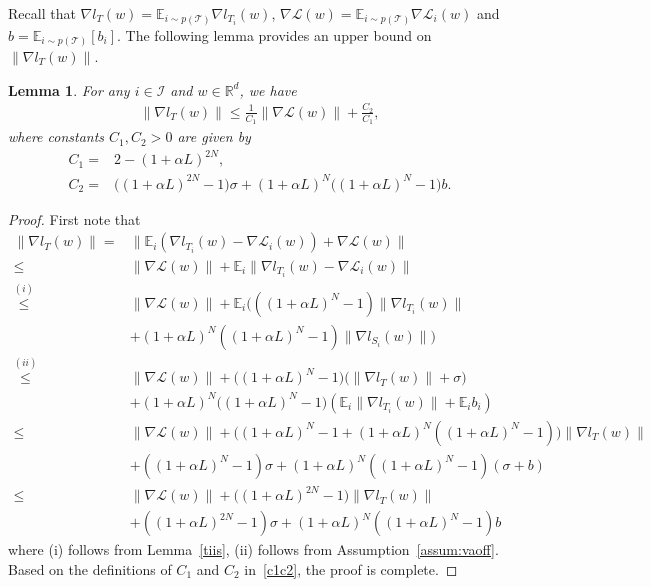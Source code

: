 \documentclass{osudissert96}
\newtheorem{lemma}{Lemma}
\begin{document}
Recall that $\nabla l_T(w) = \mathbb{E}_{i\sim p(\mathcal{T})} \nabla l_{T_i}(w)$, $\nabla \mathcal{L}(w) =  \mathbb{E}_{i\sim p(\mathcal{T})} \nabla \mathcal{L}_i(w)$ and $b = \mathbb{E}_{i\sim p(\mathcal{T})} [b_i]$. 
The following lemma provides an upper bound on $\|\nabla l_T(w)\|$.	
\begin{lemma}\label{twc1c2}
	For any $i \in\mathcal{I}$ and $w \in \mathbb{R}^d$, we have 
	\begin{align}
	\|\nabla l_T(w)\| \leq \frac{1}{C_1} \|\nabla \mathcal{L}(w)\| + \frac{C_2}{C_1},
	\end{align}
	where constants $C_1, C_2>0$ are given by 
	\begin{align}\label{c1c2}
	C_1 =& 2-(1+\alpha L)^{2N}, \nonumber
	\\C_2 =& \big( (1+\alpha L)^{2N}-1  \big)\sigma + (1+\alpha L)^N \big((1+\alpha L)^N -1 \big) b.
	\end{align}
\end{lemma}	
\begin{proof}
	First note that 
	\begin{align*}
	\|\nabla l_T(w)\| 
	=& \|\mathbb{E}_i (\nabla l_{T_i}(w) -\nabla \mathcal{L}_i(w) ) +\nabla \mathcal{L}(w)\|  \nonumber
	\\ \leq & \|\nabla \mathcal{L}(w)\| + \mathbb{E}_i \| \nabla l_{T_i}(w) -\nabla \mathcal{L}_i(w) \| \nonumber
	\\ \overset{(i)}\leq &  \|\nabla \mathcal{L}(w)\| + \mathbb{E}_i  ( ( (1+\alpha L)^N -1  )\|\nabla l_{T_i}(w)\| \nonumber
	\\&+ (1+\alpha L)^N  ( (1+\alpha L)^N -1  ) \|\nabla l_{S_i}(w)\|  ) \nonumber
	\\ \overset{(ii)}\leq &  \|\nabla \mathcal{L}(w)\| +   \big( (1+\alpha L)^N -1  \big)\big( \|\nabla l_{T}(w)\| +\sigma \big) 
	\\&+ (1+\alpha L)^N  \big( (1+\alpha L)^N -1  \big) (\mathbb{E}_i \|\nabla l_{T_i}(w)\| + \mathbb{E}_ib_i) \nonumber
	\\ \leq & \|\nabla \mathcal{L}(w)\| +   \big( (1+\alpha L)^N -1 + (1+\alpha L)^N((1+\alpha L)^N-1) \big) \|\nabla l_{T}(w)\|  \nonumber
	\\ &+ ((1+\alpha L)^N -1)\sigma + (1+\alpha L)^N((1+\alpha L)^N -1)(\sigma + b) \nonumber
	\\ \leq & \|\nabla \mathcal{L}(w)\| +   \big( (1+\alpha L)^{2N} -1 \big) \|\nabla l_{T}(w)\|  
	\\&+ ((1+\alpha L)^{2N} -1)\sigma + (1+\alpha L)^N((1+\alpha L)^N -1)b
	\end{align*}
	where (i) follows from Lemma~\ref{tiis}, (ii) follows from Assumption~\ref{assum:vaoff}. Based on the definitions of $C_1$ and $C_2$ in~\cref{c1c2}, the proof is complete. 
\end{proof}
\end{document}
